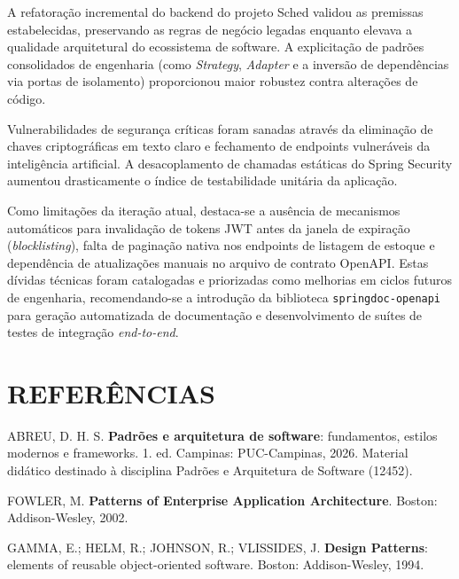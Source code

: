 \documentclass[12pt,a4paper]{article}
\begin{document}
A refatoração incremental do backend do projeto Sched validou as premissas estabelecidas, preservando as regras de negócio legadas enquanto elevava a qualidade arquitetural do ecossistema de software. A explicitação de padrões consolidados de engenharia (como \textit{Strategy}, \textit{Adapter} e a inversão de dependências via portas de isolamento) proporcionou maior robustez contra alterações de código.

Vulnerabilidades de segurança críticas foram sanadas através da eliminação de chaves criptográficas em texto claro e fechamento de endpoints vulneráveis da inteligência artificial. A desacoplamento de chamadas estáticas do Spring Security aumentou drasticamente o índice de testabilidade unitária da aplicação.

Como limitações da iteração atual, destaca-se a ausência de mecanismos automáticos para invalidação de tokens JWT antes da janela de expiração (\textit{blocklisting}), falta de paginação nativa nos endpoints de listagem de estoque e dependência de atualizações manuais no arquivo de contrato OpenAPI. Estas dívidas técnicas foram catalogadas e priorizadas como melhorias em ciclos futuros de engenharia, recomendando-se a introdução da biblioteca \texttt{springdoc-openapi} para geração automatizada de documentação e desenvolvimento de suítes de testes de integração \textit{end-to-end}.

\newpage
\section*{REFERÊNCIAS}

\noindent ABREU, D. H. S. \textbf{Padrões e arquitetura de software}: fundamentos, estilos modernos e frameworks. 1. ed. Campinas: PUC-Campinas, 2026. Material didático destinado à disciplina Padrões e Arquitetura de Software (12452).

\vspace{0.5cm}

\noindent FOWLER, M. \textbf{Patterns of Enterprise Application Architecture}. Boston: Addison-Wesley, 2002.

\vspace{0.5cm}

\noindent GAMMA, E.; HELM, R.; JOHNSON, R.; VLISSIDES, J. \textbf{Design Patterns}: elements of reusable object-oriented software. Boston: Addison-Wesley, 1994.

\vspace{0.5cm}
\end{document}
